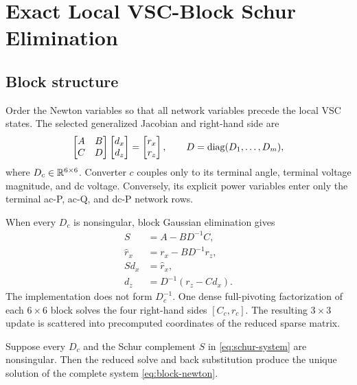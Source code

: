 \section{Exact Local VSC-Block Schur Elimination}\label{sec:schur}

\subsection{Block structure}

Order the Newton variables so that all network variables precede the local VSC
states. The selected generalized Jacobian and right-hand side are
\begin{equation}
 \begin{bmatrix}A&B\\C&D\end{bmatrix}
 \begin{bmatrix}d_x\\d_z\end{bmatrix}
 =\begin{bmatrix}r_x\\r_z\end{bmatrix},
 \qquad
 D=\operatorname{diag}(D_1,\ldots,D_m),
 \label{eq:block-newton}
\end{equation}
where $D_c\in\mathbb{R}^{6\times6}$. Converter $c$ couples only to its terminal
angle, terminal voltage magnitude, and dc voltage. Conversely, its explicit
power variables enter only the terminal ac-P, ac-Q, and dc-P network rows.

When every $D_c$ is nonsingular, block Gaussian elimination gives
\begin{subequations}\label{eq:schur-system}
\begin{align}
 S&=A-BD^{-1}C,\\
 \widehat r_x&=r_x-BD^{-1}r_z,\\
 Sd_x&=\widehat r_x,\\
 d_z&=D^{-1}(r_z-Cd_x).
\end{align}
\end{subequations}
The implementation does not form $D_c^{-1}$. One dense full-pivoting
factorization of each $6\times6$ block solves the four right-hand sides
$[C_c,r_c]$. The resulting $3\times3$ update is scattered into precomputed
coordinates of the reduced sparse matrix.

\begin{proposition}\label{prop:schur-equivalence}
Suppose every $D_c$ and the Schur complement $S$ in
\eqref{eq:schur-system} are nonsingular. Then the reduced solve and back
substitution produce the unique solution of the complete system
\eqref{eq:block-newton}.
\end{proposition}

